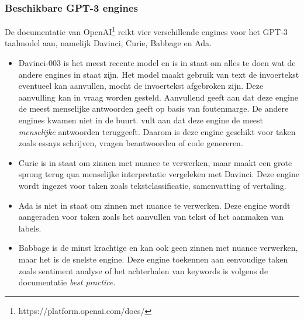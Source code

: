 \subsubsection{Beschikbare GPT-3 engines}

De documentatie van OpenAI\footnote{https://platform.openai.com/docs/} reikt vier verschillende engines voor het GPT-3 taalmodel aan, namelijk Davinci, Curie, Babbage en Ada.



\begin{itemize}
	\item Davinci-003 is het meest recente model en is in staat om alles te doen wat de andere engines in staat zijn. Het model maakt gebruik van text de invoertekst eventueel kan aanvullen, mocht de invoertekst afgebroken zijn. Deze aanvulling kan in vraag worden gesteld. Aanvullend geeft aan dat deze engine de meest menselijke antwoorden geeft op basis van foutenmarge. De andere engines kwamen niet in de buurt. \textcite{Binz2023} vult aan dat deze engine de meest \textit{menselijke} antwoorden teruggeeft. Daarom is deze engine geschikt voor taken zoals essays schrijven, vragen beantwoorden of code genereren.
	\item Curie is in staat om zinnen met nuance te verwerken, maar maakt een grote sprong terug qua menselijke interpretatie vergeleken met Davinci. Deze engine wordt ingezet voor taken zoals tekstclassificatie, samenvatting of vertaling.
	\item Ada is niet in staat om zinnen met nuance te verwerken. Deze engine wordt aangeraden voor taken zoals het aanvullen van tekst of het aanmaken van labels.
	\item Babbage is de minst krachtige en kan ook geen zinnen met nuance verwerken, maar het is de snelste engine. Deze engine toekennen aan eenvoudige taken zoals sentiment analyse of het achterhalen van keywords is volgens de documentatie \textit{best practice}.
\end{itemize} 

